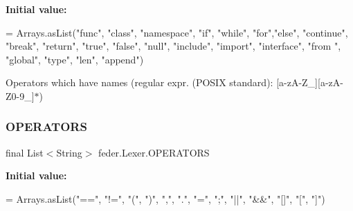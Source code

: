 {\bfseries Initial value\+:}
\begin{DoxyCode}
= Arrays.asList(\textcolor{stringliteral}{"func"}, \textcolor{stringliteral}{"class"}, \textcolor{stringliteral}{"namespace"}, \textcolor{stringliteral}{"if"}, \textcolor{stringliteral}{"while"}, \textcolor{stringliteral}{"for"},\textcolor{stringliteral}{"else"},
            \textcolor{stringliteral}{"continue"}, \textcolor{stringliteral}{"break"}, \textcolor{stringliteral}{"return"}, \textcolor{stringliteral}{"true"}, \textcolor{stringliteral}{"false"}, \textcolor{stringliteral}{"null"}, \textcolor{stringliteral}{"include"}, \textcolor{stringliteral}{"import"}, \textcolor{stringliteral}{"interface"}, \textcolor{stringliteral}{"from
      "}, \textcolor{stringliteral}{"global"},
            \textcolor{stringliteral}{"type"}, \textcolor{stringliteral}{"len"}, \textcolor{stringliteral}{"append"})
\end{DoxyCode}
Operators which have names (regular expr. (P\+O\+S\+IX standard)\+: \mbox{[}a-\/z\+A-\/\+Z\+\_\+\mbox{]}\mbox{[}a-\/z\+A-\/\+Z0-\/9\+\_\+\mbox{]}$\ast$) \mbox{\label{classfeder_1_1Lexer_a0637e17c147b9190d44a7e0c0f913242}} 
\subsubsection{\texorpdfstring{O\+P\+E\+R\+A\+T\+O\+RS}{OPERATORS}}
{\footnotesize\ttfamily final List$<$String$>$ feder.\+Lexer.\+O\+P\+E\+R\+A\+T\+O\+RS\hspace{0.3cm}{\ttfamily [static]}}

{\bfseries Initial value\+:}
\begin{DoxyCode}
= Arrays.asList(\textcolor{stringliteral}{"=="}, \textcolor{stringliteral}{"!="}, \textcolor{stringliteral}{"("}, \textcolor{stringliteral}{")"}, \textcolor{stringliteral}{","}, \textcolor{stringliteral}{"."}, \textcolor{stringliteral}{"="}, \textcolor{stringliteral}{";"}, \textcolor{stringliteral}{"||"}, \textcolor{stringliteral}{"&&"},
            \textcolor{stringliteral}{"[]"}, \textcolor{stringliteral}{"["}, \textcolor{stringliteral}{"]"})
\end{DoxyCode}
\mbox{\label{classfeder_1_1Lexer_a9b040bc2158eeda1a1f579a41bedaa92}} 

